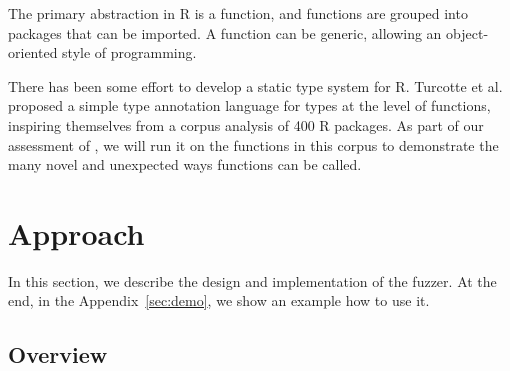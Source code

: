 \documentclass[sigplan,anonymous,review]{acmart}
\begin{document}
The primary abstraction in R is a function, and functions are grouped into packages that can be imported. 
A function can be generic, allowing an object-oriented style of programming. 

There has been some effort to develop a static type system for R.
Turcotte et al.~\cite{turcotte2020designing} proposed a simple type annotation language for types at the level of functions, inspiring themselves from a corpus analysis of 400 R packages.
As part of our assessment of \tool, we will run it on the functions in this corpus to demonstrate the many novel and unexpected ways functions can be called.




\section{Approach}
\label{sec:fuzzy}

In this section, we describe the design and implementation of the \tool fuzzer.
At the end, in the Appendix~\ref{sec:demo}, we show an example how to use it.

\subsection{Overview}
\end{document}
